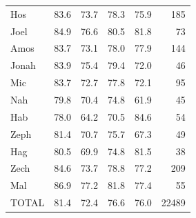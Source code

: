 \begin{table}[ht]
\begin{tabular}{lrrrrr}
Hos & 83.6 & 73.7 & 78.3 & 75.9 & 185 \\
Joel & 84.9 & 76.6 & 80.5 & 81.8 & 73 \\
Amos & 83.7 & 73.1 & 78.0 & 77.9 & 144 \\
Jonah & 83.9 & 75.4 & 79.4 & 72.0 & 46 \\
Mic & 83.7 & 72.7 & 77.8 & 72.1 & 95 \\
Nah & 79.8 & 70.4 & 74.8 & 61.9 & 45 \\
Hab & 78.0 & 64.2 & 70.5 & 84.6 & 54 \\
Zeph & 81.4 & 70.7 & 75.7 & 67.3 & 49 \\
Hag & 80.5 & 69.9 & 74.8 & 81.5 & 38 \\
Zech & 84.6 & 73.7 & 78.8 & 77.2 & 209 \\
Mal & 86.9 & 77.2 & 81.8 & 77.4 & 55 \\
\midrule
TOTAL & 81.4 & 72.4 & 76.6 & 76.0 & 22489 \\
\bottomrule
\end{tabular}
\end{table}
